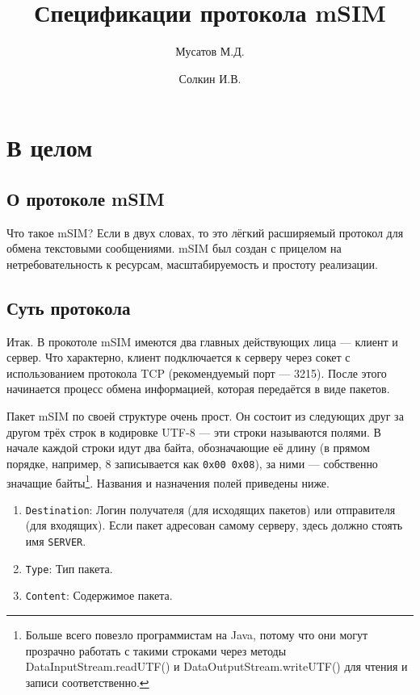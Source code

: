 \documentclass[a4paper,12pt]{book}
\title{\textbf{Спецификации протокола mSIM}}
\author{Мусатов М.Д. \and Солкин И.В.}
\begin{document}
\maketitle

\chapter{В целом}

\section{О протоколе mSIM}

Что такое mSIM? Если в двух словах, то это лёгкий расширяемый протокол для обмена текстовыми сообщениями. mSIM был создан с прицелом на нетребовательность к ресурсам, масштабируемость и простоту реализации.

\section{Суть протокола}

Итак. В прокотоле mSIM имеются два главных действующих лица --- клиент и сервер. Что характерно, клиент подключается к серверу через сокет с использованием протокола TCP (рекомендуемый порт --- 3215). После этого начинается процесс обмена информацией, которая передаётся в виде пакетов.

Пакет mSIM по своей структуре очень прост. Он состоит из следующих друг за другом трёх строк в кодировке UTF-8 --- эти строки называются полями. В начале каждой строки идут два байта, обозначающие её длину (в прямом порядке, например, 8 записывается как \texttt{0x00 0x08}), за ними --- собственно значащие байты\footnote{Больше всего повезло программистам на Java, потому что они могут прозрачно работать с такими строками через методы DataInputStream.readUTF() и DataOutputStream.writeUTF() для чтения и записи соответственно.}. Названия и назначения полей приведены ниже.

\begin{enumerate}
\item \texttt{Destination}: Логин получателя (для исходящих пакетов) или отправителя (для входящих). Если пакет адресован самому серверу, здесь должно стоять имя \texttt{SERVER}.
\item \texttt{Type}: Тип пакета.
\item \texttt{Content}: Содержимое пакета.
\end{enumerate}
\end{document}
